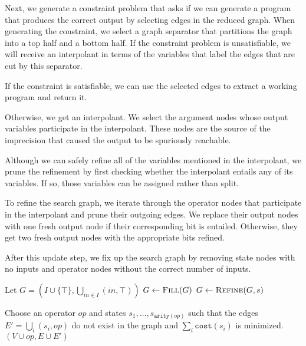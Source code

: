 \documentclass{article}
\begin{document}
Next, we generate a constraint problem that asks if we can generate a program
that produces the correct output by selecting edges in the reduced graph. When
generating the constraint, we select a graph separator that partitions the graph
into a top half and a bottom half. If the constraint problem is unsatisfiable,
we will receive an interpolant in terms of the variables that label the edges
that are cut by this separator.

If the constraint is satisfiable, we can use the selected edges to extract a
working program and return it.

Otherwise, we get an interpolant. We select the argument nodes whose output
variables participate in the interpolant. These nodes are the source of the
imprecision that caused the output to be spuriously reachable.

Although we can safely refine all of the variables mentioned in the interpolant,
we prune the refinement by first checking whether the interpolant entails any of
its variables. If so, those variables can be assigned rather than split.

To refine the search graph, we iterate through the operator nodes that
participate in the interpolant and prune their outgoing edges. We replace their
output nodes with one fresh output node if their corresponding bit is entailed.
Otherwise, they get two fresh output nodes with the appropriate bits refined.

After this update step, we fix up the search graph by removing state nodes with
no inputs and operator nodes without the correct number of inputs.

\begin{algorithm}
  \begin{algorithmic}
    \State Let $G = (I \cup \{\top\}, \bigcup_{in \in I} (in, \top))$
    \Loop
    \State $G \gets \Call{Fill}{G}$
    \State $G \gets \Call{Refine}{G, s}$
    \EndIf
    \EndLoop
    \EndFunction
  \end{algorithmic}
\end{algorithm}

\begin{algorithm}
  \begin{algorithmic}
    \State Choose an operator $op$ and states $s_1, \dots,
    s_{\texttt{arity}(op)}$ such that the edges $E' = \bigcup_i (s_i, op)$ do not exist in
    the graph and $\sum_i \texttt{cost}(s_i)$ is minimized.
    \State \Return $(V \cup {op}, E \cup E')$
    \EndFunction
  \end{algorithmic}
\end{algorithm}
\end{document}
